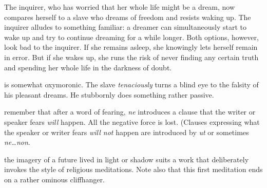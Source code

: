  The inquirer, who has worried that her whole life might be a dream, now compares herself to a slave who dreams of freedom and resists waking up. The inquirer alludes to something familiar: a dreamer can simultaneously start to wake up and try to continue dreaming for a while longer. Both options, however, look bad to the inquirer. If she remains asleep, she knowingly lets herself remain in error. But if she wakes up, she runs the risk of never finding any certain truth and spending her whole life in the darkness of doubt.

 is somewhat oxymoronic. The slave \textit{tenaciously} turns a blind eye to the falsity of his pleasant dreams. He stubbornly does something rather passive.

 remember that after a word of fearing, \textit{ne} introduces a clause that the writer or speaker fears \textit{will} happen. All the negative force is lost. (Clauses expressing what the speaker or writer fears \textit{will not} happen are introduced by \textit{ut} or sometimes \textit{ne\dots non}.

 the imagery of a future lived in light or shadow suits a work that deliberately invokes the style of religious meditations. Note also that this first meditation ends on a rather ominous cliffhanger.

